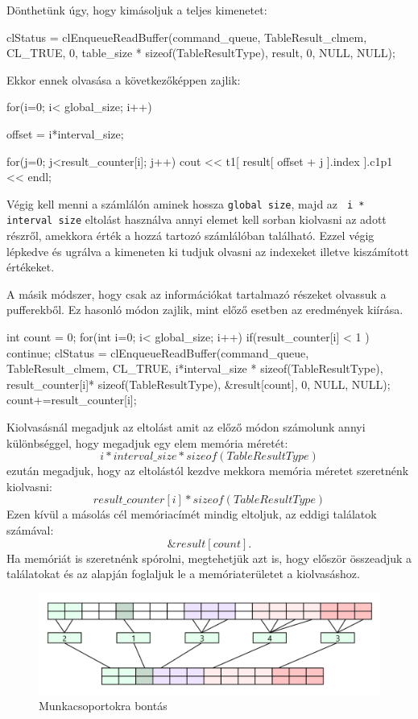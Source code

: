 Dönthetünk úgy, hogy kimásoljuk a teljes kimenetet:
\begin{python}
clStatus = clEnqueueReadBuffer(command_queue, TableResult_clmem, 
	CL_TRUE, 0, table_size * sizeof(TableResultType), result, 
	0, NULL, NULL);
\end{python}
Ekkor ennek olvasása a következőképpen zajlik:
\begin{python}
for(i=0; i< global_size; i++)
{
  offset = i*interval_size;
  
  for(j=0; j<result_counter[i]; j++)
  	cout << t1[ result[ offset + j ].index ].c1p1 << endl;
}
\end{python}
Végig kell menni a számlálón aminek hossza \texttt{global size}, majd az \texttt{ i * interval size} eltolást használva annyi elemet kell sorban kiolvasni az adott részről, amekkora érték a hozzá tartozó számlálóban található. Ezzel végig lépkedve és ugrálva a kimeneten ki tudjuk olvasni az indexeket illetve kiszámított értékeket.

A másik módszer, hogy csak az információkat tartalmazó részeket olvassuk a pufferekből. Ez hasonló módon zajlik, mint előző esetben az eredmények kiírása.

\begin{python}
int count = 0;
for(int i=0; i< global_size; i++)
{
if(result_counter[i] < 1 ) continue; 
clStatus = clEnqueueReadBuffer(command_queue, TableResult_clmem, CL_TRUE, 
	i*interval_size * sizeof(TableResultType),
	result_counter[i]* sizeof(TableResultType), 
	&result[count], 0, NULL, NULL);
	count+=result_counter[i];
}
\end{python}

Kiolvasásnál megadjuk az eltolást amit az előző módon számolunk annyi különbséggel, hogy megadjuk egy elem memória méretét:
$$i * interval\_size * sizeof(TableResultType)$$ezután megadjuk, hogy az eltolástól kezdve mekkora memória méretet szeretnénk kiolvasni: $$result\_counter[i] * sizeof(TableResultType)$$Ezen kívül a másolás cél memóriacímét mindig eltoljuk, az eddigi találatok számával: $$\&result[count].$$
Ha memóriát is szeretnénk spórolni, megtehetjük azt is, hogy először összeadjuk a találatokat és az alapján foglaljuk le a memóriaterületet a kiolvasáshoz.
\begin{figure}[h!]
\centering
\includegraphics[width=\textwidth]{images/copy_02.png}
\caption{Munkacsoportokra bontás}
\label{fig:opencl}
\end{figure}
\newpage
{}

